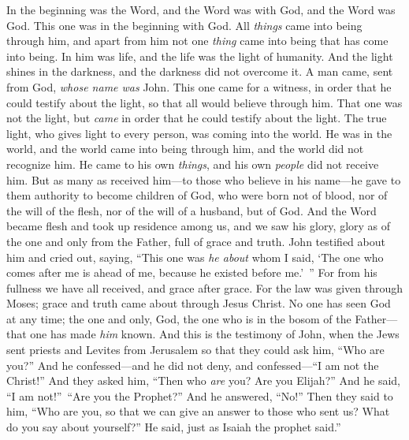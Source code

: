 
\begin{biblechapter} %
 In the beginning was the Word, and the Word was with God, and the Word was God.
\verse This one was in the beginning with God.
\verse All \textit{things} came into being through him, and apart from him not one \textit{thing} came into being that has come into being.
\verse In him was life, and the life was the light of humanity.
\verse And the light shines in the darkness, and the darkness did not overcome it.
\verse A man came, sent from God, \textit{whose name was} John.
\verse This one came for a witness, in order that he could testify about the light, so that all would believe through him.
\verse That one was not the light, but \textit{came} in order that he could testify about the light.
\verse The true light, who gives light to every person, was coming into the world.
\verse He was in the world, and the world came into being through him, and the world did not recognize him.
\verse He came to his own \textit{things}, and his own \textit{people} did not receive him.
\verse But as many as received him—to those who believe in his name—he gave to them authority to become children of God,
\verse who were born not of blood, nor of the will of the flesh, nor of the will of a husband, but of God.
\verse And the Word became flesh and took up residence among us, and we saw his glory, glory as of the one and only from the Father, full of grace and truth.
\verse John testified about him and cried out, saying, “This one was \textit{he about} whom I said, ‘The one who comes after me is ahead of me, because he existed before me.’ ”
\verse For from his fullness we have all received, and grace after grace.
\verse For the law was given through Moses; grace and truth came about through Jesus Christ.
\verse No one has seen God at any time; the one and only, God, the one who is in the bosom of the Father—that one has made \textit{him} known.
 And this is the testimony of John, when the Jews sent priests and Levites from Jerusalem so that they could ask him, “Who are you?”
\verse And he confessed—and he did not deny, and confessed—“I am not the Christ!”
\verse And they asked him, “Then who \textit{are} you? Are you Elijah?” And he said, “I am not!” “Are you the Prophet?” And he answered, “No!”
\verse Then they said to him, “Who are you, so that we can give an answer to those who sent us? What do you say about yourself?”
\verse He said,
\verse just as Isaiah the prophet said.”

\end{biblechapter}
